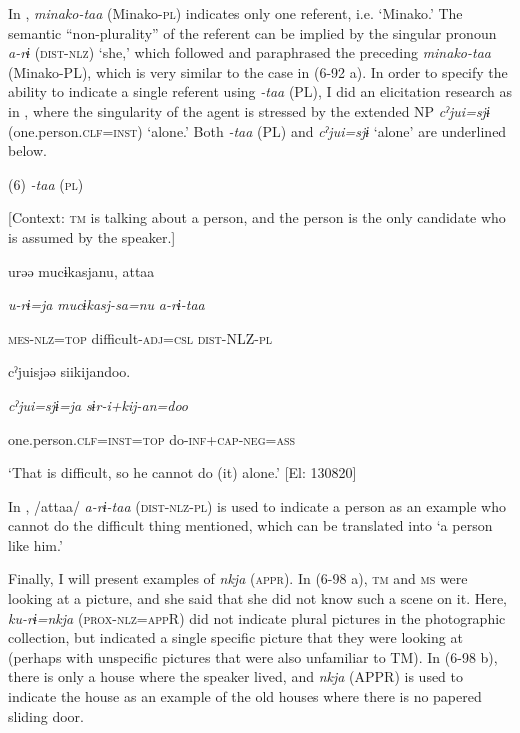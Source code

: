 In , \textit{minako-taa} (Minako-\textsc{pl}) indicates only one referent, i.e. ‘Minako.’ The semantic “non-plurality” of the referent can be implied by the singular pronoun \textit{a-rɨ} (\textsc{dist}-\textsc{nlz}) ‘she,’ which followed and paraphrased the preceding \textit{minako-taa} (Minako-PL), which is very similar to the case in (6-92 a). In order to specify the ability to indicate a single referent using \textit{{}-taa} (PL), I did an elicitation research as in , where the singularity of the agent is stressed by the extended NP \textit{cˀjui=sjɨ} (one.person.\textsc{clf}=\textsc{inst}) ‘alone.’ Both \textit{{}-taa} (PL) and \textit{cˀjui=sjɨ} ‘alone’ are underlined below.

(6)  \textit{{}-taa} (\textsc{pl})

  [Context: \textsc{tm} is talking about a person, and the person is the only candidate who is assumed by the speaker.]

{\TM}
\gll urəə  mucɨkasjanu,  attaa

    \textit{u-rɨ=ja}  \textit{mucɨkasj-sa=nu}  \textit{a-rɨ-taa}

    \textsc{mes}-\textsc{nlz}=\textsc{top}  difficult-\textsc{adj}=\textsc{csl}  \textsc{dist}-NLZ-\textsc{pl}

    cˀjuisjəə  siikijandoo.

    \textit{cˀjui=sjɨ=ja}  \textit{sɨr-i+kij-an=doo}

    one.person.\textsc{clf}=\textsc{inst}=\textsc{top}  do-\textsc{inf}+\textsc{cap}-\textsc{neg}=\textsc{ass}

\glt    ‘That is difficult, so he cannot do (it) alone.’ [El: 130820]

In , /attaa/ \textit{a-rɨ-taa} (\textsc{dist}-\textsc{nlz}-\textsc{pl}) is used to indicate a person as an example who cannot do the difficult thing mentioned, which can be translated into ‘a person like him.’

  Finally, I will present examples of \textit{nkja} (\textsc{appr}). In (6-98 a), \textsc{tm} and \textsc{ms} were looking at a picture, and she said that she did not know such a scene on it. Here, \textit{ku-rɨ=nkja} (\textsc{prox}-\textsc{nlz}=\textsc{app}R) did not indicate plural pictures in the photographic collection, but indicated a single specific picture that they were looking at (perhaps with unspecific pictures that were also unfamiliar to TM). In (6-98 b), there is only a house where the speaker lived, and \textit{nkja} (APPR) is used to indicate the house as an example of the old houses where there is no papered sliding door.

